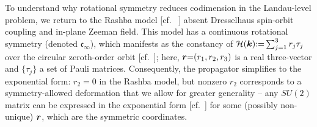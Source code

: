 \documentclass[aps, prb, showpacs, twocolumn, notitlepage, superscriptaddress]{revtex4-1}
\begin{document}


To understand why rotational symmetry reduces codimension in the Landau-level problem, we return to the Rashba model [cf. \ ] absent Dresselhaus spin-orbit coupling and in-plane Zeeman field. This model has a continuous rotational symmetry (denoted $\mathfrak{c}_{\infty}$), which manifests as the constancy of ${\cal H}(\boldsymbol{k}){:}{=}\sum_{j=1}^3r_j\tau_j$ over the circular zeroth-order orbit [cf.\ ]; here, $\boldsymbol{r}{=}(r_1,r_2,r_3)$ is a real three-vector and $\{\tau_j\}$ a set of Pauli matrices.  Consequently, the propagator  simplifies to  the exponential form:
$r_2{=}0$ in the Rashba model, but nonzero $r_2$ corresponds to a symmetry-allowed deformation that we allow for greater generality -- any $SU(2)$ matrix can be expressed in the exponential form [cf.\ ]  for some (possibly non-unique) $\boldsymbol{r}$, which are the symmetric  coordinates.  
\end{document}
